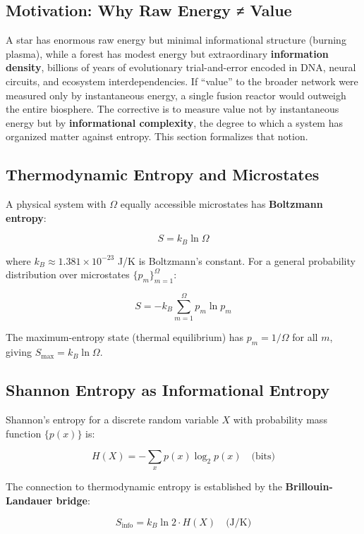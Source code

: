 \documentclass[11pt]{article}
\theoremstyle{plain}
\theoremstyle{definition}
\theoremstyle{remark}
\let\origsubsection\subsection
\renewcommand{\subsection}{\needspace{7\baselineskip}\origsubsection}
\begin{document}
\subsection{Motivation: Why Raw Energy ≠
Value}\label{motivation-why-raw-energy-value}

A star has enormous raw energy but minimal informational structure
(burning plasma), while a forest has modest energy but extraordinary
\textbf{information density}, billions of years of evolutionary
trial-and-error encoded in DNA, neural circuits, and ecosystem
interdependencies. If ``value'' to the broader network were measured
only by instantaneous energy, a single fusion reactor would outweigh the
entire biosphere. The corrective is to measure value not by
instantaneous energy but by \textbf{informational complexity}, the
degree to which a system has organized matter against entropy. This
section formalizes that notion.

\subsection{Thermodynamic Entropy and
Microstates}\label{thermodynamic-entropy-and-microstates}

A physical system with \(\Omega\) equally accessible microstates has
\textbf{Boltzmann entropy}:

\[S = k_B \ln \Omega\]

where \(k_B \approx 1.381 \times 10^{-23}\) J/K is Boltzmann's constant.
For a general probability distribution over microstates
\(\{p_m\}_{m=1}^{\Omega}\):

\[S = -k_B \sum_{m=1}^{\Omega} p_m \ln p_m\]

The maximum-entropy state (thermal equilibrium) has \(p_m = 1/\Omega\)
for all \(m\), giving \(S_{\max} = k_B \ln \Omega\).

\subsection{Shannon Entropy as Informational
Entropy}\label{shannon-entropy-as-informational-entropy}

Shannon's entropy for a discrete random variable \(X\) with probability
mass function \(\{p(x)\}\) is:

\[H(X) = -\sum_{x} p(x) \log_2 p(x) \quad \text{(bits)}\]

The connection to thermodynamic entropy is established by the
\textbf{Brillouin-Landauer bridge}:

\[S_{\text{info}} = k_B \ln 2 \cdot H(X) \quad \text{(J/K)}\]
\end{document}
